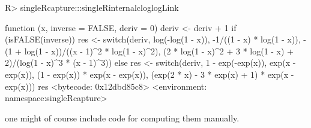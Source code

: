 \documentclass[
]{jss}
\newcommand{\1}{\mathcal{I}} \newcommand{\bZero}{\boldsymbol{0}}
\begin{document}
\begin{CodeChunk}
\begin{CodeInput}
R> singleRcapture:::singleRinternalcloglogLink
\end{CodeInput}
\begin{CodeOutput}
function (x, inverse = FALSE, deriv = 0) 
{
    deriv <- deriv + 1
    if (isFALSE(inverse)) {
        res <- switch(deriv, log(-log(1 - x)), -1/((1 - x) * 
            log(1 - x)), -(1 + log(1 - x))/((x - 1)^2 * log(1 - 
            x)^2), (2 * log(1 - x)^2 + 3 * log(1 - x) + 2)/(log(1 - 
            x)^3 * (x - 1)^3))
    }
    else {
        res <- switch(deriv, 1 - exp(-exp(x)), exp(x - exp(x)), 
            (1 - exp(x)) * exp(x - exp(x)), (exp(2 * x) - 3 * 
                exp(x) + 1) * exp(x - exp(x)))
    }
    res
}
<bytecode: 0x12dbd85c8>
<environment: namespace:singleRcapture>
\end{CodeOutput}
\end{CodeChunk}

\normalsize

one might of course include code for computing them manually.


\end{document}
